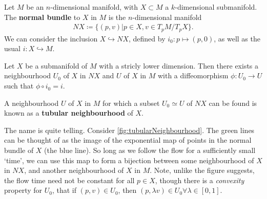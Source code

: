 \documentclass[11pt, final]{article}
\begin{document}
\begin{definition}
	Let $M$ be an $n$-dimensional manifold, with $X \subset M$ a $k$-dimensional submanifold. The \textbf{normal bundle} to $X$ in $M$ is the $n$-dimensional manifold
		\begin{align}
			NX \coloneqq \{ (p,v) | p \in X, v \in T_pM / T_pX \}.
		\end{align}
	We can consider the inclusion $X \hookrightarrow NX$, defined by $i_0 : p \mapsto (p,0)$, as well as the usual $i: X \hookrightarrow M$.
\end{definition}

\begin{theorem}\label{thm:tubNhood}
	Let $X$ be a submanifold of $M$ with a stricly lower dimension. Then there exists a neighbourhood $U_0$ of $X$ in $NX$ and $U$ of $X$ in $M$ with a diffeomorphism $\phi: U_0 \to U$ such that $\phi \circ i_0 = i$.
\end{theorem}

\begin{definition}
	A neighbourhood $U$ of $X$ in $M$ for which a subset $U_0 \simeq U$ of $NX$ can be found is known as a \textbf{tubular neighbourhood} of $X$.
\end{definition}
	
\begin{remark}
	The name is quite telling. Consider \autoref{fig:tubularNeighbourhood}. The green lines can be thought of as the image of the exponential map of points in the normal bundle of $X$ (the blue line). So long as we follow the flow for a sufficiently small `time', we can use this map to form a bijection between some neighbourhood of $X$ in $NX$, and another neighbourhood of $X$ in $M$. Note, unlike the figure suggests, the flow time need not be constant for all $p \in X$, though there is a \textit{convexity} property for $U_0$, that if $(p,v) \in U_0$, then $(p,\lambda v) \in U_0 \forall \lambda \in [0,1]$.
\end{remark}
\end{document}

